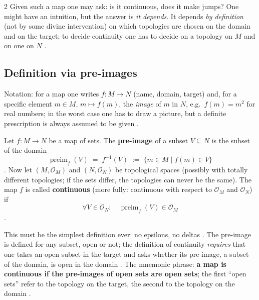 \begin{paracol}{2}
Given such a map one may ask: is it continuous, does it make jumps? One might have an intuition, but the answer is \emph{it depends}.
It depends \emph{by definition} (not by some divine intervention) on which topologies are chosen on the domain and on the target; to decide
continuity one has to decide on a topology on $M$ and on one on $N$ .

\subsection{Definition via pre-images}

Notation: for a map one writes $f\colon M\to N$ (name, domain, target) and, for a specific element $m\in M$, $m\mapsto f(m)$, the \emph{image}
of $m$ in $N$, e.g.\ $f(m)=m^2$ for real numbers; in the worst case one has to draw a picture, but a definite prescription is always
assumed to be given .

\begin{definition}\label{def:c01-continuous}
Let $f\colon M\to N$ be a map of sets. The \textbf{pre-image} of a subset $V\subseteq N$ is the subset of the domain
\[
  \operatorname{preim}_f(V)\;=\;f^{-1}(V)\;:=\;\{m\in M\mid f(m)\in V\}
\]
. Now let $(M,\mathcal O_M)$ and $(N,\mathcal O_N)$ be topological spaces (possibly with
totally different topologies; if the sets differ, the topologies can never be the same). The map $f$ is called
\textbf{continuous} (more fully: continuous with respect to $\mathcal O_M$ and $\mathcal O_N$) if
\[
  \forall V\in\mathcal O_N:\quad \operatorname{preim}_f(V)\in\mathcal O_M
\]
.
\end{definition}
This must be the simplest definition ever: no epsilons, no deltas . The pre-image is defined for any subset,
open or not; the definition of continuity \emph{requires} that one takes an open subset in the target and asks whether its pre-image,
a subset of the domain, is open in the domain . The mnemonic phrase: \textbf{a map is continuous if
the pre-images of open sets are open sets}; the first ``open sets'' refer to the topology on the target, the second to the topology on the domain
.


\end{paracol}
